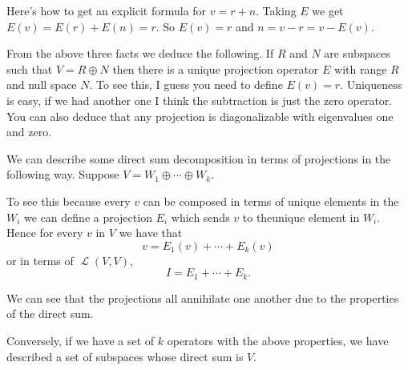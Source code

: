 \documentclass[12pt]{article}
\theoremstyle{plain}
\theoremstyle{definition}
\newcommand{\Lop}{\operatorname{\mathcal{L}}}
\begin{document}
Here's how to get an explicit formula for $v = r + n$. Taking $E$ we get $E(v) = E(r) + E(n) = r.$ So $E(v) = r$ and $n = v - r = v - E(v)$.

From the above three facts we deduce the following. If $R$ and $N$ are subspaces such that $V = R \oplus N$ then there is a unique projection operator $E$ with range $R$ and null space $N$. To see this, I guess you need to define $E(v) = r$. Uniqueness is easy, if we had another one I think the subtraction is just the zero operator. You can also deduce that any projection is diagonalizable with eigenvalues one and zero.

We can describe some direct sum decomposition in terms of projections in the following way. Suppose $V = W_1 \oplus \cdots \oplus W_k$. 

To see this because every $v$ can be composed in terms of unique elements in the $W_i$ we can define a projection $E_i$ which sends $v$ to theunique element in $W_i$. Hence for every $v$ in $V$ we have that 
\[v = E_1(v) + \cdots + E_k(v)\]
or in terms of $\Lop(V, V)$,
\[I = E_1 + \cdots + E_k.\]

We can see that the projections all annihilate one another due to the properties of the direct sum.

Conversely, if we have a set of $k$ operators with the above properties, we have described a set of subspaces whose direct sum is $V$.
\end{document}
